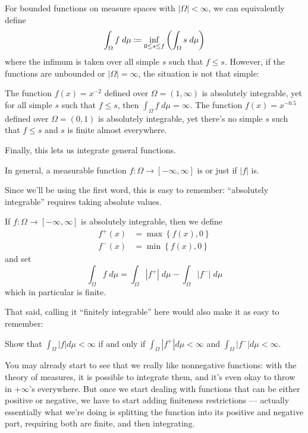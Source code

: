 \begin{remark}
	For bounded functions on measure spaces with $|\Omega| < \infty$, we can equivalently define
	\[ \int_\Omega f \; d\mu \coloneqq
		\inf_{0 \le s \le f} \left( \int_\Omega s \; d\mu \right) \]
	where the infimum is taken over all simple $s$ such that $f \leq s$.
	However, if the functions are unbounded or $|\Omega| = \infty$, the situation is not that
	simple:
	\begin{itemize}
		\ii The function $f(x) = x^{-2}$ defined over $\Omega = (1, \infty)$ is absolutely integrable,
		yet for all simple $s$ such that $f \leq s$, then $\int_\Omega f \; d\mu = \infty$.
		\ii The function $f(x) = x^{-0.5}$ defined over $\Omega = (0, 1)$ is absolutely integrable,
		yet there's no simple $s$ such that $f \leq s$ and $s$ is finite almost everywhere.
	\end{itemize}
\end{remark}

Finally, this lets us integrate general functions.
\begin{definition}
	In general, a measurable function $f \colon \Omega \to [-\infty, \infty]$
	is  or just  if $|f|$ is.
\end{definition}
Since we'll be using the first word, this is easy to remember:
``absolutely integrable'' requires taking absolute values.

\begin{step}
	If $f \colon \Omega \to [-\infty, \infty]$ is absolutely integrable,
	then we define
	\begin{align*}
		f^+(x) &= \max\left\{ f(x), 0 \right\} \\
		f^-(x) &= \min\left\{ f(x), 0 \right\}
	\end{align*}
	and set
	\[ \int_\Omega f \; d\mu = \int_\Omega |f^+| \; d\mu
		- \int_\Omega |f^-| \; d\mu \]
	which in particular is finite.
\end{step}

That said, calling it ``finitely integrable'' here would also make it as easy to remember:
\begin{exercise}
	Show that $\int_\Omega |f| d\mu < \infty$ if and only if
	$\int_\Omega |f^+| d\mu < \infty$ and
	$\int_\Omega |f^-| d\mu < \infty$.
\end{exercise}

You may already start to see that we really like nonnegative functions:
with the theory of measures, it is possible to integrate them,
and it's even okay to throw in $+\infty$'s everywhere.
But once we start dealing with functions that can be either positive or negative,
we have to start adding finiteness restrictions ---
actually essentially what we're doing is splitting
the function into its positive and negative part,
requiring both are finite, and then integrating.


